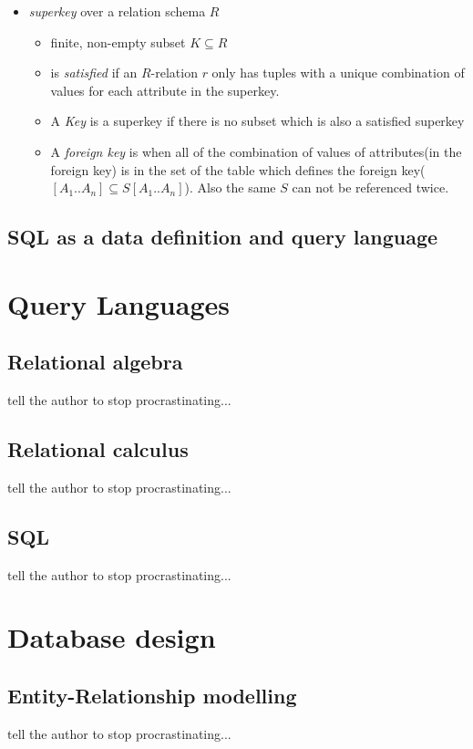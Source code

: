 \documentclass[10pt,a4paper]{article}
\begin{document}
\begin{itemize}
			\item \textit{superkey} over a relation schema $R$
			\begin{itemize}
				\item finite, non-empty subset $K \subseteq R$
				\item is \textit{satisfied} if an $R$-relation $r$ only has tuples with a unique combination of values for each attribute in the superkey.
				\item A \textit{Key} is a superkey if there is no subset which is also a satisfied superkey
				\item A \textit{foreign key} is when all of the combination of values of attributes(in the foreign key) is in the set of the table which defines the foreign key($[A_1..A_n] \subseteq S[A_1..A_n]$). Also the same $S$ can not be referenced twice.
			\end{itemize}
		\end{itemize}
	\subsection{SQL as a data definition and query language}


\section{Query Languages}
	\subsection{Relational algebra}
	tell the author to stop procrastinating...
	\subsection{Relational calculus}
	tell the author to stop procrastinating...	
	\subsection{SQL}
	tell the author to stop procrastinating...

\section{Database design}
	\subsection{Entity-Relationship modelling}
	tell the author to stop procrastinating...
\end{document}
